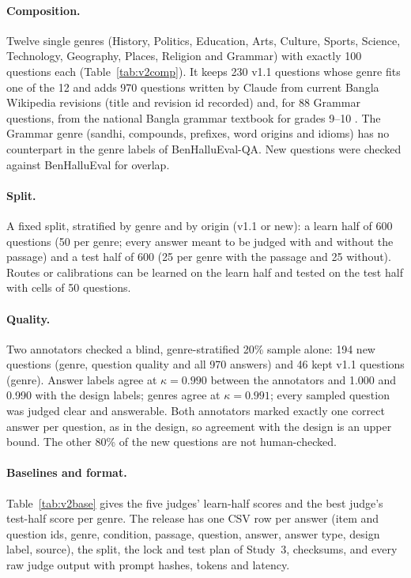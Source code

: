 \documentclass[pdflatex,sn-apa]{sn-jnl}
\begin{document}
\paragraph{Composition.} Twelve single genres (History, Politics, Education, Arts, Culture, Sports, Science,
Technology, Geography, Places, Religion and Grammar) with exactly 100 questions each (Table~\ref{tab:v2comp}). It keeps
230 v1.1 questions whose genre fits one of the 12 and adds 970 questions written by Claude from current Bangla
Wikipedia revisions (title and revision id recorded) and, for 88 Grammar questions, from the national Bangla grammar
textbook for grades 9--10 \citep{nctb2021grammar}. The Grammar genre (sandhi, compounds, prefixes, word origins and
idioms) has no counterpart in the genre labels of BenHalluEval-QA. New questions were checked against BenHalluEval
for overlap.

\paragraph{Split.} A fixed split, stratified by genre and by origin (v1.1 or new): a learn half of 600 questions (50
per genre; every answer meant to be judged with and without the passage) and a test half of 600 (25 per genre with the
passage and 25 without). Routes or calibrations can be learned on the learn half and tested on the test half with
cells of 50 questions.

\paragraph{Quality.} Two annotators checked a blind, genre-stratified 20\% sample alone: 194 new questions (genre,
question quality and all 970 answers) and 46 kept v1.1 questions (genre). Answer labels agree at $\kappa=0.990$
between the annotators and 1.000 and 0.990 with the design labels; genres agree at $\kappa=0.991$; every sampled
question was judged clear and answerable. Both annotators marked exactly one correct answer per question, as in the
design, so agreement with the design is an upper bound. The other 80\% of the new questions are not human-checked.

\paragraph{Baselines and format.} Table~\ref{tab:v2base} gives the five judges' learn-half scores and the best judge's
test-half score per genre. The release has one CSV row per answer (item and question ids, genre, condition, passage,
question, answer, answer type, design label, source), the split, the lock and test plan of Study~3, checksums, and
every raw judge output with prompt hashes, tokens and latency.
\end{document}
